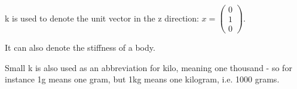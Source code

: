 k is used to denote the unit vector in the z direction: 
$ x = \left ( 
\begin{array}{c} 
  0 \\ 
  1 \\ 
  0 
\end{array} 
\right ) . $
\par
It can also denote the stiffness of a body.
\par
Small k is also used as an abbreviation for kilo, meaning one
thousand - so for instance 1g means one gram, but 1kg means one
kilogram, i.e. 1000 grams.